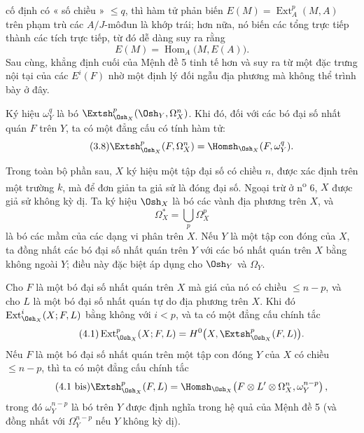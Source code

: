 cố định có « số chiều » $\leq q$, thì hàm tử phản biến
$E(M)=\operatorname{Ext}_{A}^{p}(M,A)$ trên phạm trù các $A/J$-môđun là
khớp trái; hơn nữa, nó biến các tổng trực tiếp thành các tích trực tiếp,
từ đó dễ dàng suy ra rằng
\[
  E(M)=\operatorname{Hom}_{A}\bigl(M,E(A)\bigr).
\]
 Sau cùng,
khẳng định cuối của Mệnh đề 5 tinh tế hơn và suy ra từ một
đặc trưng nội tại của các $E^{i}(F)$ nhờ một định lý đối ngẫu
địa phương mà không thể trình bày ở đây.

 Ký hiệu $\omega_Y^{q}$ là bó
$\Extsh_{\Osh_X}^{p}(\Osh_Y,\Omega_X^{n})$. Khi đó, đối với các bó đại số
nhất quán $F$ trên $Y$, ta có một đẳng cấu có tính hàm tử:
\begin{equation}\tag{3.8}
  \Extsh_{\Osh_X}^{p}(F,\Omega_X^{n})
  =\Homsh_{\Osh_X}(F,\omega_Y^{q}).
\end{equation}


Trong toàn bộ phần sau, $X$ ký hiệu một tập đại số có chiều $n$, được xác định
trên một trường $k$, mà để đơn giản ta giả sử là đóng đại số. Ngoại trừ
ở n\textsuperscript{o} 6, $X$ được giả sử không kỳ dị. Ta ký hiệu
$\Osh_X$ là bó các vành địa phương trên $X$, và
\[
  \Omega_X^{*}=\bigcup_p\Omega_X^{p}
\]
là bó các mầm của các dạng vi phân trên $X$. Nếu $Y$ là một tập con đóng của $X$, ta đồng nhất
các bó đại số nhất quán trên $Y$ với các bó nhất quán trên $X$
bằng không ngoài $Y$; điều này đặc biệt áp dụng cho $\Osh_Y$ và $\Omega_Y$.

 Cho $F$ là một bó đại số nhất quán trên $X$ mà
giá của nó có chiều $\leq n-p$, và cho $L$ là một bó đại số nhất quán
tự do địa phương trên $X$. Khi đó $\operatorname{Ext}_{\Osh_X}^{i}(X;F,L)$ bằng không
với $i<p$, và ta có một đẳng cấu chính tắc
\begin{equation}\tag{4.1}
  \operatorname{Ext}_{\Osh_X}^{p}(X;F,L)
  =H^{0}\bigl(X,\Extsh_{\Osh_X}^{p}(F,L)\bigr).
\end{equation}
Nếu $F$ là một bó đại số nhất quán trên một tập con đóng $Y$ của $X$ có
chiều $\leq n-p$, thì ta có một đẳng cấu chính tắc
\begin{equation}\tag{4.1 bis}
  \Extsh_{\Osh_X}^{p}(F,L)
  =\Homsh_{\Osh_X}\!\left(
    F\otimes L'\otimes\Omega_X^{n},\omega_Y^{n-p}
  \right),
\end{equation}
trong đó $\omega_Y^{n-p}$ là bó trên $Y$ được định nghĩa trong hệ quả của
Mệnh đề 5 (và đồng nhất với $\Omega_Y^{n-p}$ nếu $Y$ không kỳ dị).


